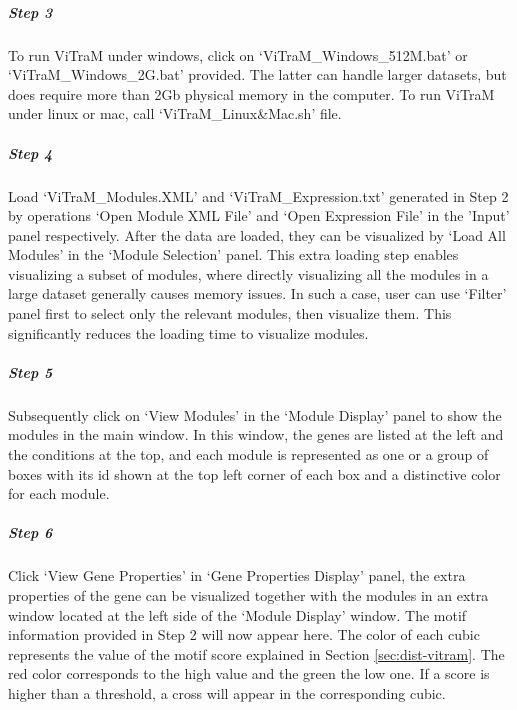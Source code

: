 \begin{small} %

\subparagraph{Step 3} To run ViTraM under windows, click on 
`ViTraM\_Windows\_512M.bat' or `ViTraM\_Windows\_2G.bat' provided.  The latter
can handle larger datasets, but does require more than 2Gb physical memory in
the computer. To run ViTraM under linux or mac, call `ViTraM\_Linux\&Mac.sh'
file.

\subparagraph{Step 4} Load `ViTraM\_Modules.XML' and `ViTraM\_Expression.txt' 
generated in Step 2 by operations `Open Module XML File' and `Open Expression
File' in the 'Input' panel respectively.  After the data are loaded, they can
be visualized by `Load All Modules' in the `Module Selection' panel.  This
extra loading step enables visualizing a subset of modules, where directly
visualizing all the modules in a large dataset generally causes memory issues.
In such a case, user can use `Filter' panel first to select only the relevant
modules, then visualize them. This significantly reduces the loading time to
visualize modules.

\subparagraph{Step 5} Subsequently click on `View Modules' in the 
`Module Display' panel to show the modules in the main window.  In this window,
the genes are listed at the left and the conditions at the top, and each module
is represented as one or a group of boxes with its id shown at the top left
corner of each box and a distinctive color for each module.

\subparagraph{Step 6} Click `View Gene Properties' in `Gene Properties 
Display' panel, the extra properties of the gene can be visualized together
with the modules in an extra window located at the left side of the `Module
Display' window. 
%
The motif information provided in Step 2 will now appear here.
%
The color of each cubic represents the value of the motif score explained in
Section \ref{sec:dist-vitram}.  The red color corresponds to the high value and
the green the low one. If a score is higher than a threshold, a cross will
appear in the corresponding cubic.



\end{small}
